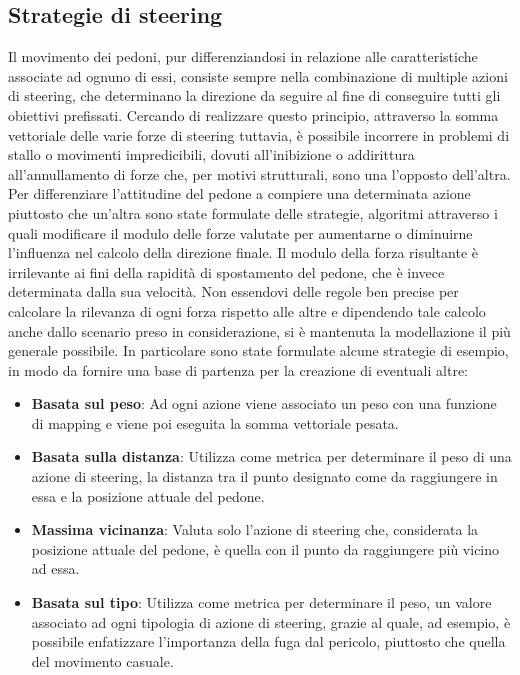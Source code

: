\subsection{Strategie di steering}
Il movimento dei pedoni, pur differenziandosi in relazione alle caratteristiche associate ad ognuno di essi, consiste sempre nella combinazione di multiple azioni di steering, che determinano la direzione da seguire al fine di conseguire tutti gli obiettivi prefissati. \newline
Cercando di realizzare questo principio, attraverso la somma vettoriale delle varie forze di steering tuttavia, è possibile incorrere in problemi di stallo o movimenti impredicibili, dovuti all'inibizione o addirittura all'annullamento di forze che, per motivi strutturali, sono una l'opposto dell'altra. \newline
Per differenziare l'attitudine del pedone a compiere una determinata azione piuttosto che un'altra sono state formulate delle strategie, algoritmi attraverso i quali modificare il modulo delle forze valutate per aumentarne o diminuirne l'influenza nel calcolo della direzione finale. \newline 
Il modulo della forza risultante è irrilevante ai fini della rapidità di spostamento del pedone, che è invece determinata dalla sua velocità. \newline 
Non essendovi delle regole ben precise per calcolare la rilevanza di ogni forza rispetto alle altre e dipendendo tale calcolo anche dallo scenario preso in considerazione, si è mantenuta la modellazione il più generale possibile. \newline 
In particolare sono state formulate alcune strategie di esempio, in modo da fornire una base di partenza per la creazione di eventuali altre:

\begin{itemize}
    \item \textbf{Basata sul peso}: Ad ogni azione viene associato un peso con una funzione di mapping e viene poi eseguita la somma vettoriale pesata. 

    \item \textbf{Basata sulla distanza}: Utilizza come metrica per determinare il peso di una azione di steering, la distanza tra il punto designato come da raggiungere in essa e la posizione attuale del pedone.

    \item \textbf{Massima vicinanza}: Valuta solo l'azione di steering che, considerata la posizione attuale del pedone, è quella con il punto da raggiungere più vicino ad essa.

    \item \textbf{Basata sul tipo}: Utilizza come metrica per determinare il peso, un valore associato ad ogni tipologia di azione di steering, grazie al quale, ad esempio, è possibile enfatizzare l'importanza della fuga dal pericolo, piuttosto che quella del movimento casuale.
\end{itemize}

